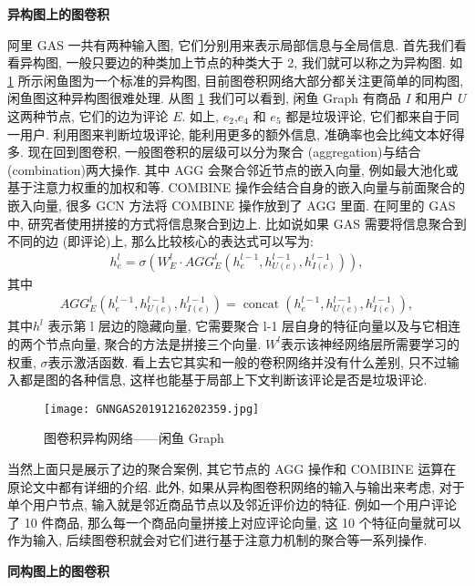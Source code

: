 \textbf{异构图上的图卷积}

阿里 GAS 一共有两种输入图, 它们分别用来表示局部信息与全局信息. 首先我们看看异构图, 一般只要边的种类加上节点的种类大于 2, 我们就可以称之为异构图.
如 \ref{GNNGAS20191216202359} 所示闲鱼图为一个标准的异构图, 目前图卷积网络大部分都关注更简单的同构图, 闲鱼图这种异构图很难处理.
从图 \ref{GNNGAS20191216202359} 我们可以看到, 闲鱼 Graph 有商品 $I$ 和用户 $U$ 这两种节点, 它们的边为评论 $E$.
如上, $e_2$,$e_4$ 和 $e_5$ 都是垃圾评论, 它们都来自于同一用户. 利用图来判断垃圾评论, 能利用更多的额外信息, 准确率也会比纯文本好得多.
现在回到图卷积, 一般图卷积的层级可以分为聚合 (aggregation)与结合 (combination)两大操作.
其中 AGG 会聚合邻近节点的嵌入向量, 例如最大池化或基于注意力权重的加权和等.
COMBINE 操作会结合自身的嵌入向量与前面聚合的嵌入向量, 很多 GCN 方法将 COMBINE 操作放到了 AGG 里面.
在阿里的 GAS 中, 研究者使用拼接的方式将信息聚合到边上. 比如说如果 GAS 需要将信息聚合到不同的边 (即评论)上, 那么比较核心的表达式可以写为:
\begin{align}
    h_{e}^{l}=\sigma\left (W_{E}^{l} \cdot A G G_{E}^{l}\left (h_{e}^{l-1}, h_{U (e)}^{l-1}, h_{I (e)}^{l-1}\right)\right),
\end{align}
其中
\begin{align*}
    A G G_{E}^{l}\left (h_{e}^{l-1}, h_{U (e)}^{l-1}, h_{I (e)}^{l-1}\right)=\operatorname{concat}\left (h_{e}^{l-1}, h_{U (e)}^{l-1}, h_{I (e)}^{l-1}\right),
\end{align*}
其中$ h^l$ 表示第 l 层边的隐藏向量, 它需要聚合 l-1 层自身的特征向量以及与它相连的两个节点向量, 聚合的方法是拼接三个向量.
$W^l$表示该神经网络层所需要学习的权重, $\sigma$表示激活函数.
看上去它其实和一般的卷积网络并没有什么差别, 只不过输入都是图的各种信息, 这样也能基于局部上下文判断该评论是否是垃圾评论.
\begin{figure}[H]
    \centering
    \texttt{[image: GNNGAS20191216202359.jpg]}
    \caption{图卷积异构网络——闲鱼 Graph}
    \label{GNNGAS20191216202359}
    \vspace{-0.4cm}
\end{figure}
当然上面只是展示了边的聚合案例, 其它节点的 AGG 操作和 COMBINE 运算在原论文中都有详细的介绍.
此外, 如果从异构图卷积网络的输入与输出来考虑,
对于单个用户节点, 输入就是邻近商品节点以及邻近评价边的特征.
例如一个用户评论了 10 件商品, 那么每一个商品向量拼接上对应评论向量, 这 10 个特征向量就可以作为输入, 后续图卷积就会对它们进行基于注意力机制的聚合等一系列操作.

\textbf{同构图上的图卷积}

